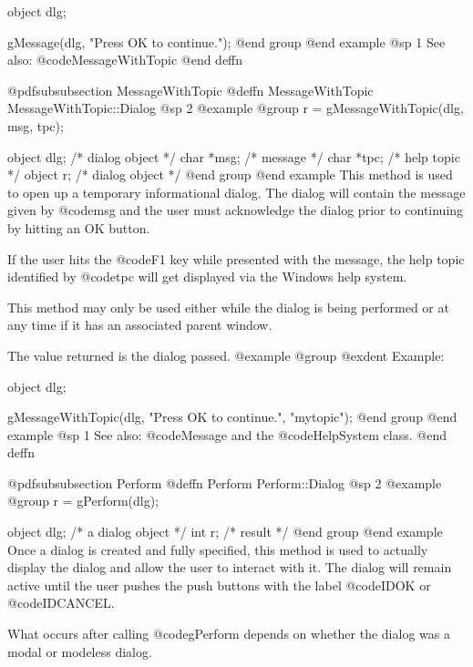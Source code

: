 object  dlg;

gMessage(dlg, "Press OK to continue.");
@end group
@end example
@sp 1
See also:  @code{MessageWithTopic}
@end deffn












@pdfsubsubsection {MessageWithTopic}
@deffn {MessageWithTopic} MessageWithTopic::Dialog
@sp 2
@example
@group
r = gMessageWithTopic(dlg, msg, tpc);

object  dlg;    /*  dialog object  */
char    *msg;   /*  message        */
char    *tpc;   /*  help topic     */
object  r;      /*  dialog object  */
@end group
@end example
This method is used to open up a temporary informational dialog.  The
dialog will contain the message given by @code{msg} and the user must
acknowledge the dialog prior to continuing by hitting an OK button.

If the user hits the @code{F1} key while presented with the message,
the help topic identified by @code{tpc} will get displayed via the Windows
help system.

This method may only be used either while the dialog is being performed
or at any time if it has an associated parent window.

The value returned is the dialog passed.
@example
@group
@exdent Example:

object  dlg;

gMessageWithTopic(dlg, "Press OK to continue.", "mytopic");
@end group
@end example
@sp 1
See also:  @code{Message} and the @code{HelpSystem} class.
@end deffn














@pdfsubsubsection {Perform}
@deffn {Perform} Perform::Dialog
@sp 2
@example
@group
r = gPerform(dlg);

object  dlg;    /*  a dialog object  */
int     r;      /*  result           */
@end group
@end example
Once a dialog is created and fully specified, this method is used to
actually display the dialog and allow the user to interact with it.
The dialog will remain active until the user pushes the push buttons
with the label @code{IDOK} or @code{IDCANCEL}.

What occurs after calling @code{gPerform} depends on whether the dialog
was a modal or modeless dialog.

